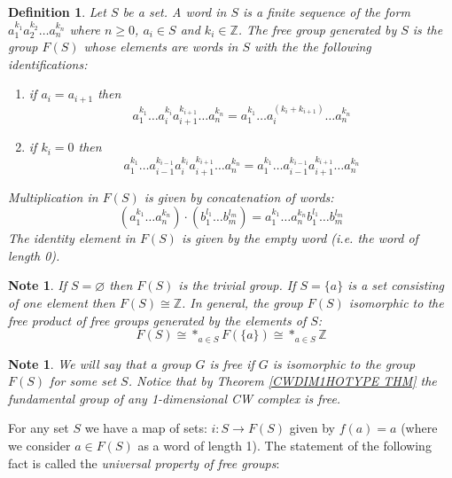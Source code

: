 \documentclass[11pt, letterpaper, oneside]{report}
\theoremstyle{pplain}
\theoremstyle{ddefinition}
\newtheorem{definition}[theorem]{Definition}
\newtheorem{note}[theorem]{Note}
\theoremstyle{nnn}
\theoremstyle{eexercise}
\newcommand{\Z}{{\mathbb Z}}
\newcommand{\benu}{\begin{enumerate}}
\newcommand{\eenu}{\end{enumerate}}
\begin{document}
\begin{definition}
Let $S$ be a set. A \emph{word} in $S$ is a finite sequence of the form
$a_{1}^{k_{1}}a_{2}^{k_{2}} {\dots} a_{n}^{k_{n}}$
where $n\geq 0$,  $a_{i}\in S$ and $k_{i}\in \Z$. 
The \emph{free group generated by } $S$ is the group $F(S)$ whose elements
are words in $S$ with the the following identifications:
\benu
\item[\textbullet] if $a_{i} = a_{i+1}$ then
$$a_{1}^{k_{1}} {\dots}  a^{k_{i}}_{i} a^{k_{i+1}}_{i+1} {\dots} a_{n}^{k_{n}} = 
a_{1}^{k_{1}} {\dots} a_{i}^{(k_{i}+k_{i+1})} {\dots} a_{n}^{k_{n}}$$
\item[\textbullet] if $k_{i} = 0$ then 
$$a_{1}^{k_{1}} {\dots}  a_{i-1}^{k_{i-1}}a^{k_{i}}_{i} a^{k_{i+1}}_{i+1} {\dots} a_{n}^{k_{n}} = 
a_{1}^{k_{1}} {\dots}  a_{i-1}^{k_{i-1}}a^{k_{i+1}}_{i+1} {\dots} a_{n}^{k_{n}}$$
\eenu
Multiplication in $F(S)$ is given by concatenation of words: 
$$(a_{1}^{k_{1}}\dots a_{n}^{k_{n}})\cdot (b_{1}^{l_{1}}\dots b_{m}^{l_{m}}) = 
a_{1}^{k_{1}}\dots a_{n}^{k_{n}}b_{1}^{l_{1}}\dots b_{m}^{l_{m}}$$
The identity element in $F(S)$ is given by the empty word (i.e. the word of length 0).
\end{definition}


\begin{note}
If $S = \varnothing$ then $F(S)$ is the trivial group. 
If $S = \{a\}$ is a set consisting of one element then $F(S) \cong \Z$. 
 In general, the group 
$F(S)$ isomorphic to the free product of free groups generated by the elements of $S$:
$$F(S) \cong \ast_{a\in S} F(\{a\}) \cong \ast_{a\in S}\Z$$
\end{note}


\begin{note}
We will say that a group $G$ is free if $G$ is isomorphic to the group $F(S)$ for some set $S$. 
Notice that by Theorem \ref{CWDIM1HOTYPE THM} the fundamental group of any 1-dimensional 
CW complex is free. 
\end{note}

For any set $S$ we have a map of sets: $i\colon  S \to F(S)$ given by $f(a) = a$
(where we consider $a\in F(S)$ as a word of length 1). The statement of the following fact is 
called the \emph{universal property of free groups}:
\end{document}
